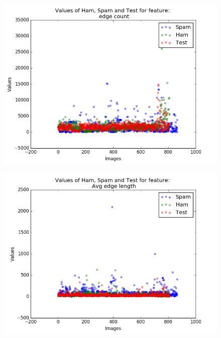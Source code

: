 \begin{figure}[h]
	\centering
	\begin{minipage}{.5\textwidth}
		\centering
		\includegraphics[width=\linewidth]{images/appA/edgecount_values_scatter}
		\label{fig:edgecount_values_scatter}
	\end{minipage}%
	\begin{minipage}{.5\textwidth}
		\centering
		\includegraphics[width=\linewidth]{images/appA/Avgedgelength_values_scatter}
		\label{fig:Avgedgelength_values_scatter}
	\end{minipage}
\end{figure}


